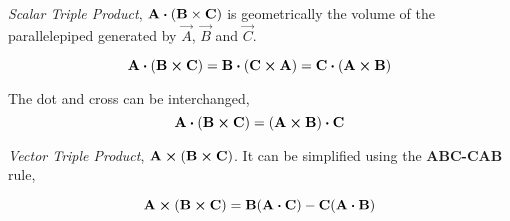 \emph{Scalar Triple Product}, \(\vec{A} \dtp (\vec{B} \times \vec{C})\) is geometrically
the volume of the parallelepiped generated by \(\vec{A}\), \(\vec{B}\) and \(\vec{C}\). 

\[
    \vec{A} \dtp (\vec{B} \cp \vec{C}) = \vec{B} \dtp (\vec{C} \cp \vec{A}) 
    = \vec{C} \dtp (\vec{A} \cp \vec{B}) 
\]

The dot and cross can be interchanged,
\[
    \vec{A} \dtp (\vec{B} \cp \vec{C}) = (\vec{A} \cp \vec{B}) \dtp \vec{C}
\]

\noindent \emph{Vector Triple Product}, \(\vec{A} \cp (\vec{B} \cp \vec{C})\). It can
be simplified using the \textbf{ABC-CAB} rule,

\[
    \vec{A} \cp (\vec{B} \cp \vec{C}) = \vec{B}(\vec{A} \dtp \vec{C}) -
    \vec{C}(\vec{A} \dtp \vec{B})
\]



